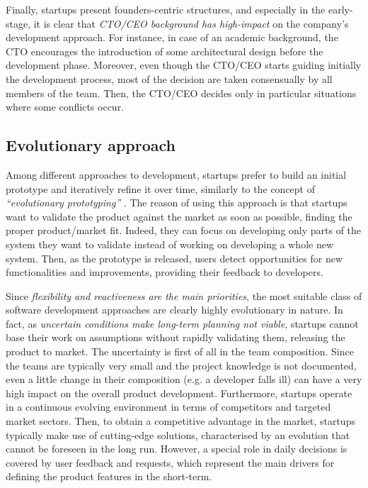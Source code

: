\documentclass[10pt,journal,letterpaper,compsoc]{IEEEtran}
\begin{document}
Finally, startups present founders-centric structures, and especially in the 
early-stage, it is clear that \textit{CTO/CEO background has high-impact} on the 
company's development approach. For instance, in case of an academic background, 
the CTO encourages the introduction of some architectural design before the 
development phase. Moreover, even though the CTO/CEO starts guiding initially 
the development process, most of the decision are taken consensually by all 
members of the team. Then, the CTO/CEO decides only in particular situations 
where some conflicts occur.
\subsection{Evolutionary approach}
\label{res:gsm:cat2}
Among different approaches to development, startups prefer to build an initial 
prototype and iteratively refine it over time, similarly to the concept of 
\textit{``evolutionary prototyping''} \cite{EvProt}. The reason of using this 
approach is that startups want to validate the product against the market as 
soon as possible, finding the proper product/market fit. Indeed, they can focus 
on developing only parts of the system they want to validate instead of working 
on developing a whole new system. Then, as the prototype is released, users 
detect opportunities for new functionalities and improvements, providing their 
feedback to developers.


Since \textit{flexibility and reactiveness are the main priorities}, the most 
suitable class of software development approaches are clearly highly 
evolutionary in nature. In fact, as \textit{uncertain conditions make long-term 
planning not viable}, startups cannot base their work on assumptions without 
rapidly validating them, releasing the product to market. The uncertainty is 
first of all in the team composition. Since the teams are typically very small 
and the project knowledge is not documented, even a little change in their 
composition (e.g. a developer falls ill) can have a very high impact on the 
overall product development. Furthermore, startups operate in a continuous 
evolving environment in terms of competitors and targeted market sectors. Then, 
to obtain a competitive advantage in the market, startups typically make use of 
cutting-edge solutions, characterised by an evolution that cannot be foreseen in 
the long run. However, a special role in daily decisions is covered by user 
feedback and requests, which represent the main drivers for defining the product 
features in the short-term.
\end{document}
